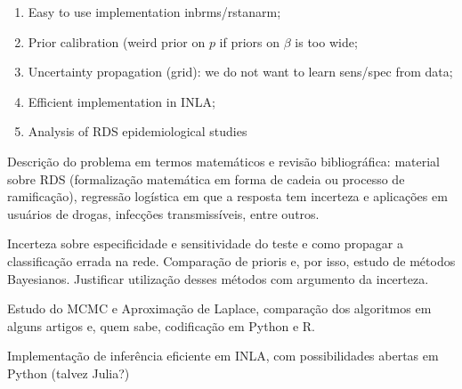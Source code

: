 \begin{enumerate}
    \item Easy to use implementation inbrms/rstanarm;
    \item Prior calibration (weird prior on $p$ if priors on $\beta$ is too wide;
    \item Uncertainty propagation (grid):  we do not want to learn sens/spec from data;
    \item Efficient implementation in INLA;
    \item Analysis of RDS epidemiological studies
\end{enumerate}

\begin{alineas}
    \item Descrição do problema em termos matemáticos e revisão bibliográfica:
    material sobre RDS (formalização matemática em forma de cadeia ou processo
    de ramificação), regressão logística em que a resposta tem incerteza e
    aplicações em usuários de drogas, infecções transmissíveis, entre outros. 
    \item Incerteza sobre especificidade e sensitividade do teste e como
    propagar a classificação errada na rede. Comparação de prioris e, por isso, estudo de
    métodos Bayesianos. Justificar utilização desses métodos com argumento da
    incerteza. 
    \item Estudo do MCMC e Aproximação de Laplace, comparação dos algoritmos
    em alguns artigos e, quem sabe, codificação em Python e R. 
    \item Implementação de inferência eficiente em INLA, com possibilidades
    abertas em Python (talvez Julia?)
\end{alineas}